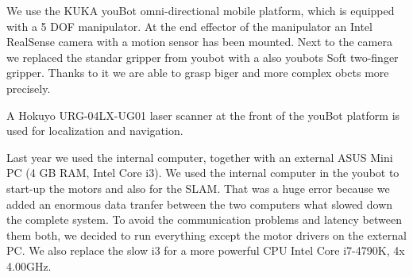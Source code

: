 We use the KUKA youBot omni-directional mobile platform, which is equipped with a 5 DOF manipulator. At the end effector of the manipulator an Intel RealSense camera with a motion sensor has been mounted. Next to the camera we replaced the standar gripper from youbot with a also youbots Soft two-finger gripper. Thanks to it we are able to grasp biger and more complex obcts more precisely.

A Hokuyo URG-04LX-UG01 laser scanner at the front of the youBot platform is used for localization and navigation. 

Last year we used the internal computer, together with an external ASUS Mini PC (4 GB RAM, Intel Core i3). We used the internal computer in the youbot to start-up the motors and also for the SLAM. That was a huge error because we added an enormous data tranfer between the two computers what slowed down the complete system. To avoid the communication problems and latency between them both, we decided to run everything except the motor drivers on the external PC. We also replace the slow i3 for a more powerful CPU Intel Core i7-4790K, 4x 4.00GHz. 
